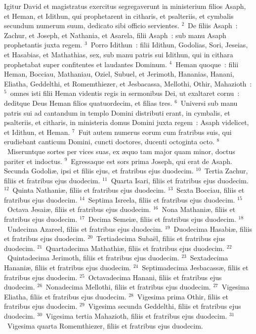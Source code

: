 \lettrine[lines=3,image=true,loversize=0.05,lraise=-0.03]{I}{}gitur David et magistratus exercitus segregaverunt in ministerium filios Asaph, et Heman, et Idithun, qui prophetarent in citharis, et psalteriis, et cymbalis secundum numerum suum, dedicato sibi officio servientes.
${}^{2}$~De filiis Asaph~: Zachur, et Joseph, et Nathania, et Asarela, filii Asaph~: sub manu Asaph prophetantis juxta regem.
${}^{3}$~Porro Idithun~: filii Idithun, Godolias, Sori, Jeseias, et Hasabias, et Mathathias, sex, sub manu patris sui Idithun, qui in cithara prophetabat super confitentes et laudantes Dominum.
${}^{4}$~Heman quoque~: filii Heman, Bocciau, Mathaniau, Oziel, Subuel, et Jerimoth, Hananias, Hanani, Eliatha, Geddelthi, et Romemthiezer, et Jesbacassa, Mellothi, Othir, Mahazioth~:
${}^{5}$~omnes isti filii Heman videntis regis in sermonibus Dei, ut exaltaret cornu~: deditque Deus Heman filios quatuordecim, et filias tres.
${}^{6}$~Universi sub manu patris sui ad cantandum in templo Domini distributi erant, in cymbalis, et psalteriis, et citharis, in ministeria domus Domini juxta regem~: Asaph videlicet, et Idithun, et Heman.
${}^{7}$~Fuit autem numerus eorum cum fratribus suis, qui erudiebant canticum Domini, cuncti doctores, ducenti octoginta octo.
${}^{8}$~Miseruntque sortes per vices suas, ex \ae quo tam major quam minor, doctus pariter et indoctus.
${}^{9}$~Egressaque est sors prima Joseph, qui erat de Asaph. Secunda Godoli\ae , ipsi et filiis ejus, et fratribus ejus duodecim.
${}^{10}$~Tertia Zachur, filiis et fratribus ejus duodecim.
${}^{11}$~Quarta Isari, filiis et fratribus ejus duodecim.
${}^{12}$~Quinta Nathani\ae , filiis et fratribus ejus duodecim.
${}^{13}$~Sexta Bocciau, filiis et fratribus ejus duodecim.
${}^{14}$~Septima Isreela, filiis et fratribus ejus duodecim.
${}^{15}$~Octava Jesai\ae , filiis et fratribus ejus duodecim.
${}^{16}$~Nona Mathani\ae , filiis et fratribus ejus duodecim.
${}^{17}$~Decima Semei\ae , filiis et fratribus ejus duodecim.
${}^{18}$~Undecima Azareel, filiis et fratribus ejus duodecim.
${}^{19}$~Duodecima Hasabi\ae , filiis et fratribus ejus duodecim.
${}^{20}$~Tertiadecima Suba\"el, filiis et fratribus ejus duodecim.
${}^{21}$~Quartadecima Mathathi\ae , filiis et fratribus ejus duodecim.
${}^{22}$~Quintadecima Jerimoth, filiis et fratribus ejus duodecim.
${}^{23}$~Sextadecima Hanani\ae , filiis et fratribus ejus duodecim.
${}^{24}$~Septimadecima Jesbacass\ae , filiis et fratribus ejus duodecim.
${}^{25}$~Octavadecima Hanani, filiis et fratribus ejus duodecim.
${}^{26}$~Nonadecima Mellothi, filiis et fratribus ejus duodecim.
${}^{27}$~Vigesima Eliatha, filiis et fratribus ejus duodecim.
${}^{28}$~Vigesima prima Othir, filiis et fratribus ejus duodecim.
${}^{29}$~Vigesima secunda Geddelthi, filiis et fratribus ejus duodecim.
${}^{30}$~Vigesima tertia Mahazioth, filiis et fratribus ejus duodecim.
${}^{31}$~Vigesima quarta Romemthiezer, filiis et fratribus ejus duodecim.

